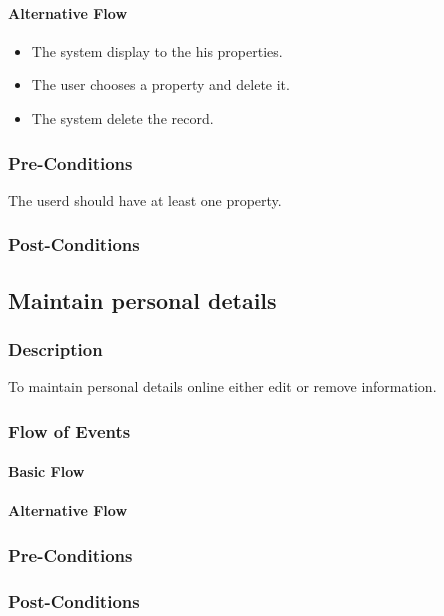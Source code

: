 \documentclass[a4paper,12pt]{article}
\begin{document}
\paragraph{Alternative Flow}
\begin{itemize}
\item The system display to the his properties.
\item The user chooses a property and delete it.
\item The system delete the record. 
\end{itemize}

\subsubsection{Pre-Conditions}
The userd should have at least one property.
\subsubsection{Post-Conditions}

\subsection{Maintain personal details}
\subsubsection{Description}
To maintain personal details online either edit or remove information.
\subsubsection{Flow of Events}
\paragraph{Basic Flow}
\begin{itemize}
\end{itemize}

\paragraph{Alternative Flow}
\begin{itemize}
\end{itemize}

\subsubsection{Pre-Conditions}
\subsubsection{Post-Conditions}
\end{document}
